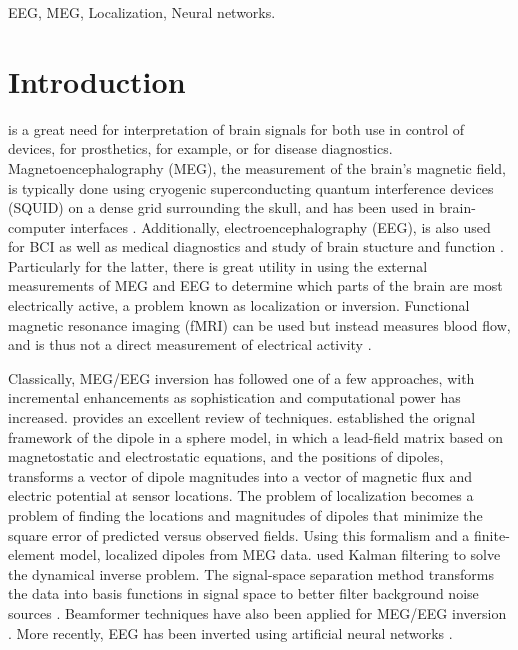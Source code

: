 \documentclass[journal]{IEEEtran}
\begin{document}
\begin{IEEEkeywords}
EEG, MEG, Localization, Neural networks.
\end{IEEEkeywords}



\IEEEpeerreviewmaketitle



\section{Introduction}

 is a great need for interpretation of brain signals for both use in control of devices, for prosthetics, for example, or for disease diagnostics. Magnetoencephalography (MEG), the measurement of the brain's magnetic field, is typically done using cryogenic superconducting quantum interference devices (SQUID) on a dense grid surrounding the skull, and has been used in brain-computer interfaces \cite{mellinger2007meg}. Additionally, electroencephalography (EEG), is also used for BCI as well as medical diagnostics and study of brain stucture and function \cite{da2008impact}. Particularly for the latter, there is great utility in using the external measurements of MEG and EEG to determine which parts of the brain are most electrically active, a problem known as localization or inversion. Functional magnetic resonance imaging (fMRI) can be used but instead measures blood flow, and is thus not a direct measurement of electrical activity \cite{sharon2007advantage}.


Classically, MEG/EEG inversion has followed one of a few approaches, with incremental enhancements as sophistication and computational power has increased. \cite{grech2008review} provides an excellent review of techniques. \cite{mosher1992multiple} established the orignal framework of the dipole in a sphere model, in which a lead-field matrix based on magnetostatic and electrostatic equations, and the positions of dipoles, transforms a vector of dipole magnitudes into a vector of magnetic flux and electric potential at sensor locations. The problem of localization becomes a problem of finding the locations and magnitudes of dipoles that minimize the square error of predicted versus observed fields. Using this formalism and a finite-element model, \cite{buchner1997inverse} localized dipoles from MEG data. \cite{galka2004solution} used Kalman filtering to solve the dynamical inverse problem. The signal-space separation method transforms the data into basis functions in signal space to better filter background noise sources \cite{taulu2005applications}. Beamformer techniques have also been applied for MEG/EEG inversion \cite{sekihara2001reconstructing}. More recently, EEG has been inverted using artificial neural networks \cite{van2000eeg}.
\end{document}
